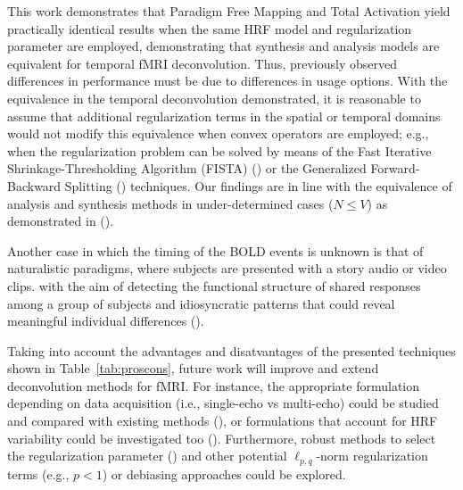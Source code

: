 This work demonstrates that Paradigm Free Mapping and Total Activation yield practically identical results when the same HRF model and regularization parameter are employed, demonstrating that synthesis and analysis models are equivalent for temporal fMRI deconvolution. Thus, previously observed differences in performance must be due to differences in usage options. With the equivalence in the temporal deconvolution demonstrated, it is reasonable to assume that additional regularization terms in the spatial or temporal domains would not modify this equivalence when convex operators are employed; e.g., when the regularization problem can be solved by means of the Fast Iterative Shrinkage-Thresholding Algorithm (FISTA) (\citealt{beck2009FastIterativeShrinkagethresholding}) or the Generalized Forward-Backward Splitting (\citealt{raguet2013GeneralizedForwardBackwardSplittinga}) techniques. Our findings are in line with the equivalence of analysis and synthesis methods in under-determined cases (\(N \leq V\)) as demonstrated in (\citealt{elad2007AnalysisSynthesisSignal}).

Another case in which the timing of the BOLD events is unknown is that of naturalistic paradigms, where subjects are presented with a story audio or video clips. with the aim of detecting the functional structure of shared responses among a group of subjects and idiosyncratic patterns that could reveal meaningful individual differences (\citealt{finn2020MoviewatchingOutperformsRest,finn2020IdiosynchronySharedResponses,betzel2020TemporalFluctuationsBrain,faskowitz2020EdgecentricFunctionalNetwork}).

Taking into account the advantages and disatvantages of the presented techniques shown in Table~\ref{tab:proscons}, future work will improve and extend deconvolution methods for fMRI. For instance, the appropriate formulation depending on data acquisition (i.e., single-echo vs multi-echo) could be studied and compared with existing methods (\citealt{caballero-gaudes2019DeconvolutionAlgorithmMultiecho}), or formulations that account for HRF variability could be investigated too (\citealt{badillo2013GrouplevelImpactsBetweensubject,gaudes2012StructuredSparseDeconvolution,farouj2019BoldSignalDeconvolution}). Furthermore, robust methods to select the regularization parameter (\citealt{urunuela2020StabilityBasedSparseParadigm,meinshausen2009StabilitySelection}) and other potential \(\ell_{p,q}\)-norm regularization terms (e.g., \(p < 1\)) or debiasing approaches could be explored.